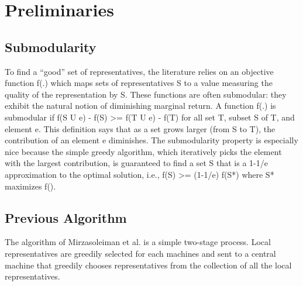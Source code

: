 \section{Preliminaries}
\label{s:prelim}
\subsection{Submodularity}
To find a “good” set of representatives, the literature relies on an objective function f(.) which maps sets of representatives S to a value measuring the quality of the representation by S. These functions are often submodular: they exhibit the natural notion of diminishing marginal return. A function f(.)  is submodular if f(S U {e}) - f(S) >= f(T U {e}) - f(T) for all set T, subset S of T, and element e. This definition says that as a set grows larger (from S to T), the contribution of an element e diminishes. The submodularity property is especially nice because the simple greedy algorithm, which iteratively picks the element with the largest contribution, is guaranteed to find a set S that is a 1-1/e approximation to the optimal solution, i.e., f(S) >= (1-1/e) f(S*) where S* maximizes f(). 

\subsection{Previous Algorithm}
The algorithm of Mirzasoleiman et al. is a simple two-stage process. Local representatives are greedily selected for each machines and sent to a central machine that greedily chooses representatives from the collection of all the local representatives.